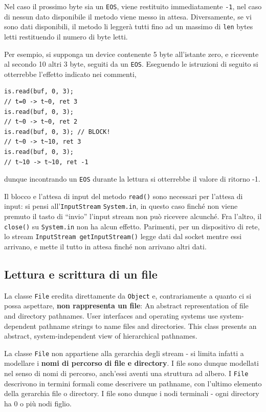 \documentclass[\fontsizeclass,twocolumn]{\classname}
\theoremstyle{definition}
\theoremstyle{definition}
\begin{document}
Nel caso il prossimo byte sia un \texttt{EOS}, viene restituito immediatamente
\texttt{-1}, nel caso di nessun dato disponibile il metodo viene messo in
attesa. Diversamente, se vi sono dati disponibili, il metodo li leggerà tutti
fino ad un massimo di \texttt{len} bytes letti restituendo il numero di byte
letti.

Per esempio, si supponga un device contenente 5 byte all'istante zero, e
ricevente al secondo 10 altri 3 byte, seguiti da un \texttt{EOS}. Eseguendo le
istruzioni di seguito si otterrebbe l'effetto indicato nei commenti,

\begin{lstlisting}
is.read(buf, 0, 3);
// t=0 -> t~0, ret 3
is.read(buf, 0, 3);
// t~0 -> t~0, ret 2
is.read(buf, 0, 3); // BLOCK!
// t~0 -> t~10, ret 3
is.read(buf, 0, 3);
// t~10 -> t~10, ret -1
\end{lstlisting}

dunque incontrando un \texttt{EOS} durante la lettura si otterrebbe il valore di ritorno
-1.

Il blocco e l'attesa di input del metodo \texttt{read()} sono necessari per
l'attesa di input: si pensi all'\texttt{Input\-Stream} \texttt{System.in}, in
questo caso finché non viene premuto il tasto di ``invio'' l'input stream non
può ricevere alcunché. Fra l'altro, il \texttt{close()} su \texttt{System.in}
non ha alcun effetto. Parimenti, per un dispositivo di rete, lo stream
\texttt{InputStream getInputStream()} legge dati dal socket mentre essi
arrivano, e mette il tutto in attesa finché non arrivano altri dati.

\subsection{Lettura e scrittura di un file}

La classe \texttt{File} eredita direttamente da \texttt{Object} e,
contrariamente a quanto ci si possa aspettare, \textbf{non rappresenta un
file}: {\footnotesize An abstract representation of file and directory pathnames.
User interfaces and operating systems use system-dependent pathname strings to
name files and directories. This class presents an abstract, system-independent
view of hierarchical pathnames.}

La classe \texttt{File} non appartiene alla gerarchia degli stream \-- si
limita infatti a modellare i \textbf{nomi di percorso di file e directory}. I
file sono dunque modellati nel senso di nomi di percorso, anch'essi aventi una
struttura ad albero. I \texttt{File} descrivono in termini formali come
descrivere un pathname, con l'ultimo elemento della gerarchia file o directory.
I file sono dunque i nodi terminali \-- ogni directory ha 0 o più nodi figlio.
\end{document}
